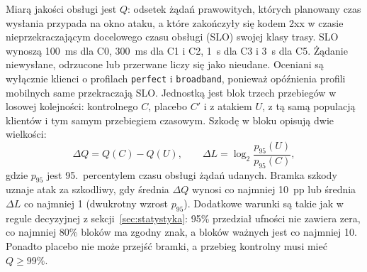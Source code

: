 \documentclass[a4paper,12pt]{article}
\begin{document}
Miarą jakości obsługi jest $Q$: odsetek żądań prawowitych, których planowany czas wysłania przypada na okno ataku, a które zakończyły się kodem 2xx w czasie nieprzekraczającym docelowego czasu obsługi (SLO) swojej klasy trasy. SLO wynoszą 100~ms dla C0, 300~ms dla C1 i C2, 1~s dla C3 i 3~s dla C5. Żądanie niewysłane, odrzucone lub przerwane liczy się jako nieudane. Oceniani są wyłącznie klienci o profilach \texttt{perfect} i \texttt{broadband}, ponieważ opóźnienia profili mobilnych same przekraczają SLO. Jednostką jest blok trzech przebiegów w losowej kolejności: kontrolnego $C$, placebo $C'$ i z atakiem $U$, z tą samą populacją klientów i tym samym przebiegiem czasowym. Szkodę w bloku opisują dwie wielkości:
\begin{equation}
\Delta Q = Q(C) - Q(U), \qquad \Delta L = \log_2 \frac{p_{95}(U)}{p_{95}(C)},
\end{equation}
gdzie $p_{95}$ jest 95.~percentylem czasu obsługi żądań udanych. Bramka szkody uznaje atak za szkodliwy, gdy średnia $\Delta Q$ wynosi co najmniej 10~pp lub średnia $\Delta L$ co najmniej 1 (dwukrotny wzrost $p_{95}$). Dodatkowe warunki są takie jak w regule decyzyjnej z sekcji~\ref{sec:statystyka}: 95\% przedział ufności nie zawiera zera, co najmniej 80\% bloków ma zgodny znak, a bloków ważnych jest co najmniej 10. Ponadto placebo nie może przejść bramki, a przebieg kontrolny musi mieć $Q \geq 99\%$.
\end{document}
